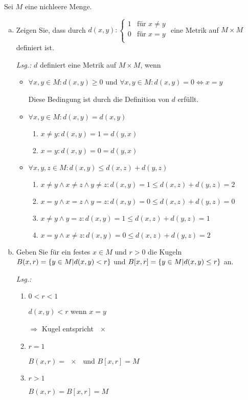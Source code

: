 \documentclass{article}
\begin{document}
Sei $M$ eine nichleere Menge.
\begin{enumerate}[a)]
\item Zeigen Sie, dass durch $d(x, y) \colon \begin{cases}
    1 & \text{für $x \ne y$} \\
    0 & \text{für $x = y$} \\
  \end{cases}$ eine Metrik auf $M \times M$ definiert ist.

  \textit{Lsg.:} $d$ definiert eine Metrik auf $M \times M$, wenn
  \begin{itemize}
  \item $\forall x, y \in M \colon d(x,y) \geq 0$ und
    $\forall x,y \in M \colon d(x,y) = 0 \iff x = y$

    Diese Bedingung ist durch die Definition von $d$ erfüllt.

  \item $\forall x,y \in M \colon d(x, y) = d(x, y)$
    \begin{enumerate}[label={Fall \arabic*:},leftmargin=*]
    \item $x \ne y \colon d(x, y) = 1 = d(y, x)$
    \item $x = y \colon d(x, y) = 0 = d(y, x)$
    \end{enumerate}
    
  \item $\forall x,y,z \in M \colon d(x,y) \leq d(x,z) + d(y,z)$
    \begin{enumerate}[label={Fall \arabic*:},leftmargin=*]
    \item $x \ne y \land x \ne z \land y \ne z \colon d(x, y) = 1 \leq d(x, z) + d(y, z) = 2$
    \item $x = y \land x = z \land y = z \colon d(x, y) = 0 \leq d(x, z) + d(y, z) = 0$
    \item $x \ne y \land y = z \colon d(x, y) = 1 \leq d(x, z) + d(y, z) = 1$
    \item $x = y \land x \ne z \colon d(x, y) = 0 \leq d(x, z) + d(y, z) = 2$
    \end{enumerate}
    
  \end{itemize}
  
\item Geben Sie für ein festes $x \in M$ und $r > 0$ die Kugeln
  $B(x, r) = \qty{ y \in M \middle| d(x, y) < r}$ und
  $B[x, r] = \qty{ y \in M \middle| d(x, y) \leq r}$ an.

  \textit{Lsg.:}
  \begin{enumerate}[label={Fall \arabic*:},leftmargin=*]
  \item $0 < r < 1$

    $d(x, y) < r$ wenn $x = y$

    $\Rightarrow$ Kugel entspricht $\qty{x}$
  \item $r = 1$

    $B(x, r) = \qty{x}$ und $B[x,r] = M$
  \item $r > 1$

    $B(x, r) = B[x, r] = M$
  \end{enumerate}
\end{enumerate}
\end{document}
